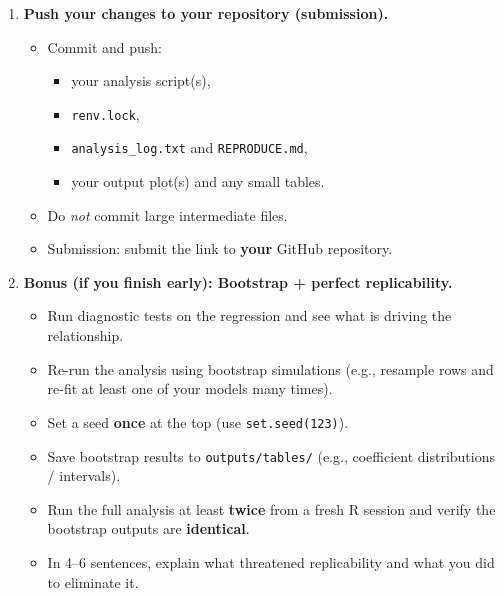 \documentclass[11pt]{article}
\begin{document}
\begin{enumerate}
\begin{itemize}
  \item \textbf{Run three different regressions (hard-coded, sequential) using \texttt{income} as the dependent variable:}
  \item Save a simple regression table (or clearly printed model summaries) to \texttt{outputs/tables/}.


  \item \textbf{Logging requirement:} Create/update \texttt{analysis\_log.txt} so it records:
  \begin{itemize}
    \item when the analysis was run,
    \item the number of rows loaded,
    \item which outputs were written (filenames/paths),
    \item the output of \texttt{sessionInfo()} written to a file (e.g., \texttt{outputs/session\_info.txt}).
  \end{itemize}
\end{itemize}

\item \textbf{Push your changes to your repository (submission).}
\begin{itemize}
  \item Commit and push:
  \begin{itemize}
    \item your analysis script(s),
    \item \texttt{renv.lock},
    \item \texttt{analysis\_log.txt} and \texttt{REPRODUCE.md},
    \item your output plot(s) and any small tables.
  \end{itemize}
  \item Do \emph{not} commit large intermediate files.
  \item Submission: submit the link to \textbf{your} GitHub repository.
\end{itemize}

\item \textbf{Bonus (if you finish early): Bootstrap + perfect replicability.}
\begin{itemize}
\item Run diagnostic tests on the regression and see what is driving the relationship. 
  \item Re-run the analysis using bootstrap simulations (e.g., resample rows and re-fit at least one of your models many times).
  \item Set a seed \textbf{once} at the top (use \texttt{set.seed(123)}).
  \item Save bootstrap results to \texttt{outputs/tables/} (e.g., coefficient distributions / intervals).
  \item Run the full analysis at least \textbf{twice} from a fresh R session and verify the bootstrap outputs are \textbf{identical}.
  \item In 4--6 sentences, explain what threatened replicability and what you did to eliminate it.
\end{itemize}

\end{enumerate}
\end{document}

